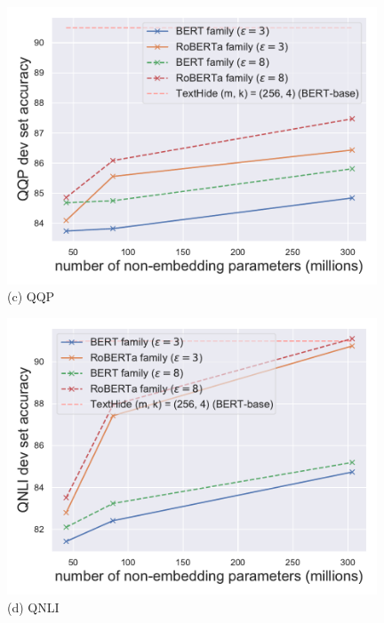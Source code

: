 \begin{figure}[ht]
\begin{center}
\begin{minipage}[t]{0.45\linewidth}
\centering
{\includegraphics[width=0.98\textwidth]{figs/scaling-qqp.pdf}}
(c) QQP
\end{minipage}
\begin{minipage}[t]{0.45\linewidth}
\centering
{\includegraphics[width=0.98\textwidth]{figs/scaling-qnli.pdf}}
(d) QNLI
\end{minipage}
\end{center}


\end{figure}
